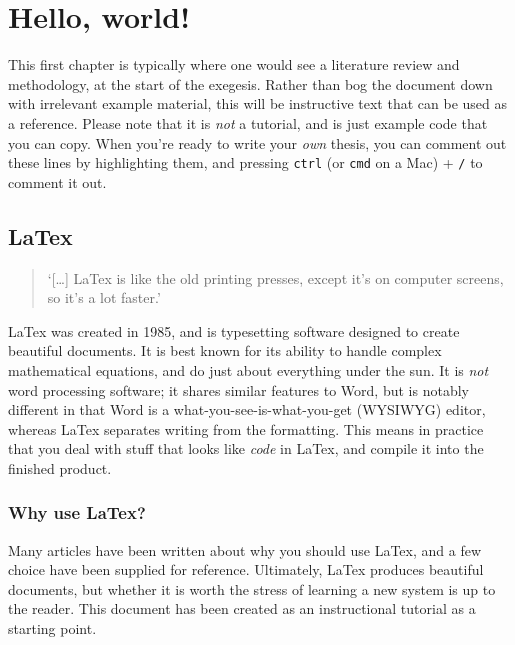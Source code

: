 
\renewcommand*{\thefootnote}{\arabic{footnote}}
\setcounter{footnote}{0}

\chapter{Hello, world!}

This first chapter is typically where one would see a literature review and methodology, at the start of the exegesis.
Rather than bog the document down with irrelevant example material, this will be instructive text that can be used as a reference.
Please note that it is \emph{not} a tutorial, and is just example code that you can copy.
When you're ready to write your \emph{own} thesis, you can comment out these lines by highlighting them, and pressing \lstinline{ctrl} (or \lstinline{cmd} on a Mac) + \lstinline{/} to comment it out.

\section{LaTex}

\begin{quotation}
    `[\ldots] LaTex is like the old printing presses, except it's on computer screens, so it's a lot faster.'
\end{quotation}
LaTex was created in 1985, and is typesetting software designed to create beautiful documents. 
It is best known for its ability to handle complex mathematical equations, and do just about everything under the sun.
It is \emph{not} word processing software; it shares similar features to Word, but is notably different in that Word is a what-you-see-is-what-you-get (WYSIWYG) editor, whereas LaTex separates writing from the formatting.
This means in practice that you deal with stuff that looks like \emph{code} in LaTex, and compile it into the finished product. 

\subsection{Why use LaTex?}
Many articles have been written about why you should use LaTex, and a few choice have been supplied for reference.
Ultimately, LaTex produces beautiful documents, but whether it is worth the stress of learning a new system is up to the reader.
This document has been created as an instructional tutorial as a starting point.

